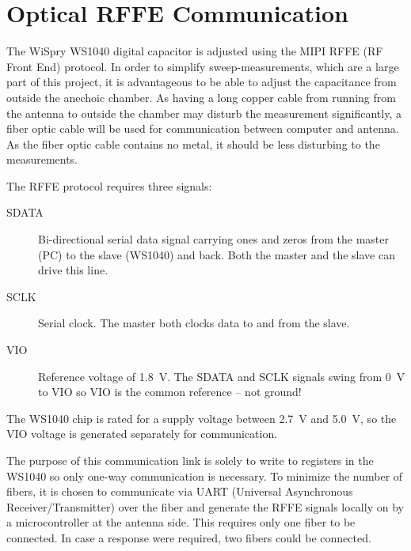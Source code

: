 \chapter{Optical RFFE Communication}
\label{cha:optical_rffe_comm}
The WiSpry WS1040 digital capacitor is adjusted using the MIPI RFFE (RF Front End) protocol. In order to simplify sweep-measurements, which are a large part of this project, it is advantageous to be able to adjust the capacitance from outside the anechoic chamber. As having a long copper cable from running from the antenna to outside the chamber may disturb the measurement significantly, a fiber optic cable will be used for communication between computer and antenna. As the fiber optic cable contains no metal, it should be less disturbing to the measurements.

The RFFE protocol requires three signals:
\begin{description}
    \item[SDATA] Bi-directional serial data signal carrying ones and zeros from the master (PC) to the slave (WS1040) and back. Both the master and the slave can drive this line.
    \item[SCLK] Serial clock. The master both clocks data to and from the slave.
    \item[VIO] Reference voltage of \SI{1.8}{V}. The SDATA and SCLK signals swing from \SI{0}{V} to VIO so VIO is the common reference -- not ground!
\end{description}
The WS1040 chip is rated for a supply voltage between \SI{2.7}{V} and \SI{5.0}{V}, so the VIO voltage is generated separately for communication.

The purpose of this communication link is solely to write to registers in the WS1040 so only one-way communication is necessary. To minimize the number of fibers, it is chosen to communicate via UART (Universal Asynchronous Receiver/Transmitter) over the fiber and generate the RFFE signals locally on by a microcontroller at the antenna side. This requires only one fiber to be connected. In case a response were required, two fibers could be connected.

